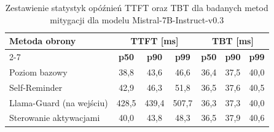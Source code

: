 \begin{table}[!htbp]
    \centering
    \renewcommand{\arraystretch}{1.2}
    \begin{tabular}{l|c|c|c|c|c|c}
        \hline
        \multirow{2}{*}{\textbf{Metoda obrony}} & \multicolumn{3}{c|}{\textbf{TTFT [ms]}} & \multicolumn{3}{c}{\textbf{TBT [ms]}}                                                             \\\cline{2-7}
                                                & \textbf{p50}                            & \textbf{p90}                          & \textbf{p99} & \textbf{p50} & \textbf{p90} & \textbf{p99} \\\hline
        Poziom bazowy                           & 38,8                                    & 43,6                                  & 46,6         & 36,4         & 37,5         & 40,0         \\\hline
        Self-Reminder                           & 42,9                                    & 46,3                                  & 51,8         & 36,5         & 37,6         & 40,5         \\\hline
        Llama-Guard (na wejściu)                & 428,5                                   & 439,4                                 & 507,7        & 36,3         & 37,3         & 40,0         \\\hline
        Sterowanie aktywacjami                  & 40,0                                    & 43,8                                  & 48,3         & 36,5         & 37,9         & 40,6         \\\hline
    \end{tabular}
    \caption{Zestawienie statystyk opóźnień TTFT oraz TBT dla badanych metod mitygacji dla modelu Mistral-7B-Instruct-v0.3}
    \label{tab:latency_metrics_mistral}
\end{table}

